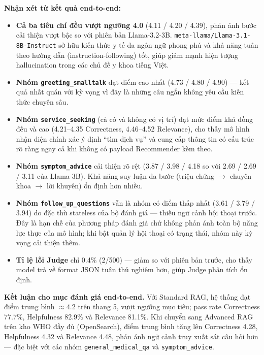 \noindent\textbf{Nhận xét từ kết quả end-to-end:}
\begin{itemize}
    \item \textbf{Cả ba tiêu chí đều vượt ngưỡng 4.0} (4.11 / 4.20 / 4.39), phản ánh bước cải thiện vượt bậc so với phiên bản Llama-3.2-3B. \texttt{meta-llama/Llama-3.1-8B-Instruct} sở hữu kiến thức y tế đa ngôn ngữ phong phú và khả năng tuân theo hướng dẫn (instruction-following) tốt, giúp giảm mạnh hiện tượng hallucination trong các chủ đề y khoa tiếng Việt.
    \item \textbf{Nhóm \texttt{greeting\_smalltalk}} đạt điểm cao nhất (4.73 / 4.80 / 4.90) — kết quả nhất quán với kỳ vọng vì đây là những câu ngắn không yêu cầu kiến thức chuyên sâu.
    \item \textbf{Nhóm \texttt{service\_seeking}} (cả có và không có vị trí) đạt mức điểm khá đồng đều và cao (4.21--4.35 Correctness, 4.46--4.52 Relevance), cho thấy mô hình nhận diện chính xác ý định ``tìm dịch vụ'' và cung cấp thông tin có cấu trúc rõ ràng ngay cả khi không có payload Recommender kèm theo.
    \item \textbf{Nhóm \texttt{symptom\_advice}} cải thiện rõ rệt (3.87 / 3.98 / 4.18 so với 2.69 / 2.69 / 3.11 của Llama-3B). Khả năng suy luận đa bước (triệu chứng $\rightarrow$ chuyên khoa $\rightarrow$ lời khuyên) ổn định hơn nhiều.
    \item \textbf{Nhóm \texttt{follow\_up\_questions}} vẫn là nhóm có điểm thấp nhất (3.61 / 3.79 / 3.94) do đặc thù stateless của bộ đánh giá — thiếu ngữ cảnh hội thoại trước. Đây là hạn chế của phương pháp đánh giá chứ không phản ánh toàn bộ năng lực thực của mô hình; khi bật quản lý hội thoại có trạng thái, nhóm này kỳ vọng cải thiện thêm.
    \item \textbf{Tỉ lệ lỗi Judge} chỉ 0.4\% (2/500) — giảm so với phiên bản trước, cho thấy model trả về format JSON tuân thủ nghiêm hơn, giúp Judge phân tích ổn định.
\end{itemize}

\textbf{Kết luận cho mục đánh giá end-to-end.}
Với Standard RAG, hệ thống đạt điểm trung bình $\approx 4.2$ trên thang 5, vượt ngưỡng mục tiêu; pass rate Correctness 77.7\%, Helpfulness 82.9\% và Relevance 81.1\%. Khi chuyển sang Advanced RAG trên kho WHO đầy đủ (OpenSearch), điểm trung bình tăng lên Correctness 4.28, Helpfulness 4.32 và Relevance 4.48, phản ánh ngữ cảnh truy xuất sát câu hỏi hơn --- đặc biệt với các nhóm \texttt{general\_medical\_qa} và \texttt{symptom\_advice}.

